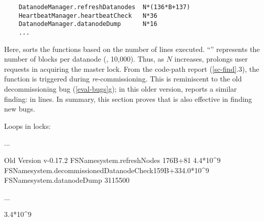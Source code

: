 \vminfive
{\footnotesize
\begin{verbatim}
    DatanodeManager.refreshDatanodes  N*(136*B+137)   
    HeartbeatManager.heartbeatCheck   N*36
    DatanodeManager.datanodeDump      N*16
    ...
\end{verbatim}
}



Here, \sfind sorts the functions based on the number of lines executed.
``'' represents the number of blocks per datanode (\eg, 10,000).
%
Thus, as $N$ increases,  prolongs user requests in
acquiring the master lock.
%
From the code-path report (\sec\ref{sc-find}.3), the function is triggered
during {\em re}-commissioning.  This is reminiscent to the old
decommissioning bug \hdtwo (\sec\ref{eval-bugs}g); in this older version,
\sfind reports a similar finding: 
in  lines.
%
In summary, this section proves that \sck is also effective in finding new
bugs.




Loops in locks:


...

Old Version v-0.17.2
FSNamesystem.refreshNodes  176B+81 4.4*10^9
FSNamesystem.decommissionedDatanodeCheck159B+334.0*10^9
FSNamesystem.datanodeDump 3115500


...

  3.4*10^9
\fi
